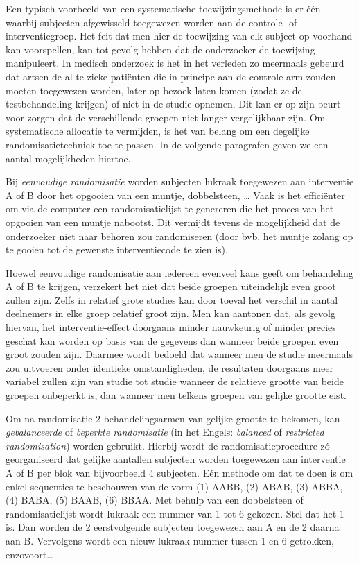 \documentclass[
  12pt,dutch,coursenotes]{book}
\begin{document}
Een typisch voorbeeld van een systematische toewijzingsmethode is er één
waarbij subjecten afgewisseld toegewezen worden aan de controle- of
interventiegroep. Het feit dat men hier de toewijzing van elk subject op voorhand kan
voorspellen, kan tot gevolg hebben dat de onderzoeker de toewijzing
manipuleert. In medisch onderzoek is het in het verleden zo meermaals gebeurd dat artsen de al te zieke patiënten die in principe aan de
controle arm zouden moeten toegewezen worden, later op bezoek laten komen
(zodat ze de testbehandeling krijgen) of niet in de studie opnemen. Dit
kan er op zijn beurt voor zorgen dat de verschillende groepen niet langer
vergelijkbaar zijn. Om systematische allocatie te vermijden, is het van
belang om een degelijke randomisatietechniek toe te passen. In de volgende
paragrafen geven we een aantal mogelijkheden hiertoe.

Bij \emph{eenvoudige randomisatie} worden subjecten lukraak toegewezen
aan interventie A of B door het opgooien van een muntje, dobbelsteen, \ldots{}
Vaak is het efficiënter om via de computer een randomisatielijst te
genereren die het proces van het opgooien van een muntje nabootst. Dit
vermijdt tevens de mogelijkheid dat de onderzoeker niet naar behoren zou
randomiseren (door bvb. het muntje zolang op te gooien tot de gewenste
interventiecode te zien is).

Hoewel eenvoudige randomisatie aan iedereen evenveel kans geeft om
behandeling A of B te krijgen, verzekert het niet dat beide groepen
uiteindelijk even groot zullen zijn. Zelfs in relatief grote studies kan
door toeval het verschil in aantal deelnemers in elke groep relatief groot
zijn. Men kan aantonen dat, als gevolg hiervan, het interventie-effect
doorgaans minder nauwkeurig of minder precies geschat kan worden op basis
van de gegevens dan wanneer beide groepen even groot zouden zijn. Daarmee
wordt bedoeld dat wanneer men de studie meermaals zou uitvoeren onder
identieke omstandigheden, de resultaten doorgaans meer variabel zullen zijn
van studie tot studie wanneer de relatieve grootte van beide groepen onbeperkt
is, dan wanneer men telkens groepen van gelijke grootte eist.

Om na randomisatie 2 behandelingsarmen van gelijke grootte te bekomen, kan
\emph{gebalanceerde} of \emph{beperkte randomisatie} (in het Engels:
\emph{balanced} of \emph{restricted randomisation}) worden gebruikt.
Hierbij wordt de randomisatieprocedure zó georganiseerd dat gelijke
aantallen subjecten worden toegewezen aan interventie A of B per blok van
bijvoorbeeld 4 subjecten. Eén methode om dat te doen is om enkel
sequenties te beschouwen van de vorm (1) AABB, (2) ABAB, (3) ABBA, (4) BABA,
(5) BAAB, (6) BBAA. Met behulp van een dobbelsteen of randomisatielijst
wordt lukraak een nummer van 1 tot 6 gekozen. Stel dat het 1 is. Dan worden
de 2 eerstvolgende subjecten toegewezen aan A en de 2 daarna aan B.
Vervolgens wordt een nieuw lukraak nummer tussen 1 en 6 getrokken,
enzovoort\ldots{}
\end{document}
